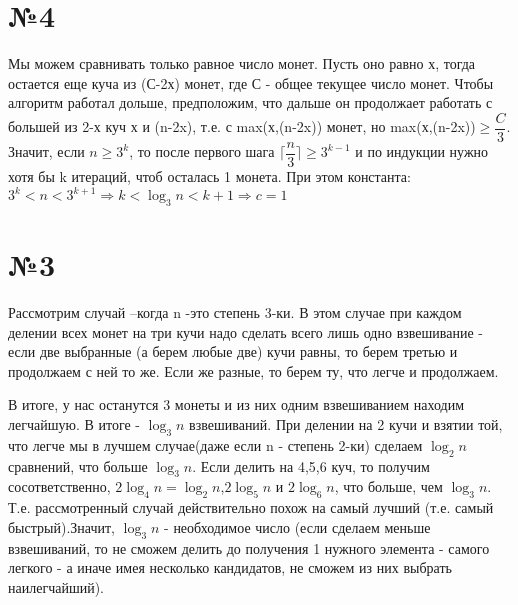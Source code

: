 \documentclass[a4paper,12pt]{article} %
\begin{document}
\section*{№4}
Мы можем сравнивать только равное число монет. Пусть оно равно х, тогда остается еще куча из (С-2х) монет, где С - общее текущее число монет. Чтобы алгоритм работал дольше, предположим, что дальше он продолжает работать с большей из 2-х куч х и (n-2x), т.е. с max(х,(n-2x)) монет, но max(х,(n-2x))$\geqslant \dfrac{C}{3}$. Значит, если $ n\geqslant 3^k$, то после первого шага $ \big\lceil\dfrac{n}{3}\big\rceil\geqslant 3^{k-1}$ и по индукции нужно хотя бы k итераций, чтоб осталась 1 монета. При этом константа:  $3^{k}<n<3^{k+1} \Rightarrow k<\log_3{n}<k+1 \Rightarrow c=1$ 


\section*{№3}
Рассмотрим случай --когда n -это степень 3-ки. В этом случае при каждом делении всех монет на три кучи надо сделать всего лишь одно взвешивание - если две выбранные (а берем любые две)  кучи равны, то берем третью и продолжаем с ней то же. Если же разные, то берем ту, что легче и продолжаем.

В итоге, у нас останутся 3 монеты и из них одним взвешиванием находим легчайшую. В итоге - $\log_{3}{n}$ взвешиваний. При делении на 2 кучи и взятии той, что легче мы в лучшем случае(даже если n - степень 2-ки) сделаем  $\log_{2}{n}$ сравнений, что больше $\log_{3}{n}$. Если делить на 4,5,6 куч, то получим сосответственно, $2\log_{4}{n}=\log_{2}{n}$,$2\log_{5}{n}$ и $2\log_{6}{n}$, что больше, чем $\log_{3}{n}$. Т.е. рассмотренный случай действительно похож на самый лучший (т.е. самый быстрый).Значит, $\log_{3}{n}$ - необходимое число (если сделаем меньше взвешиваний, то не сможем делить до получения 1 нужного элемента - самого легкого - а иначе имея несколько кандидатов, не сможем из них выбрать наилегчайший).\\
\end{document}

